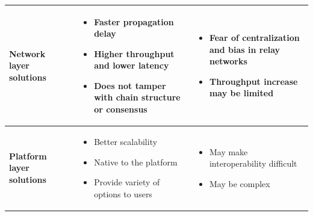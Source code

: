\begin{table}[htbp]
{\begin{tabularx}{\textwidth}{@{}p{2.4cm} p{2.7cm} >{\raggedright\arraybackslash}X >{\raggedright\arraybackslash}X@{}}
\multirow{1}{*}{\textbf{Network layer solutions}}
&  &
\begin{itemize}
  \item Faster propagation delay
  \item Higher throughput and lower latency
  \item Does not tamper with chain structure or consensus
\end{itemize} &
\begin{itemize}
  \item Fear of centralization and bias in relay networks
  \item Throughput increase may be limited
\end{itemize} \\
\midrule

\multirow{1}{*}{\textbf{Platform layer solutions}}
&  &
\begin{itemize}
  \item Better scalability
  \item Native to the platform
  \item Provide variety of options to users
\end{itemize} &
\begin{itemize}
  \item May make interoperability difficult
  \item May be complex
\end{itemize} \\
\bottomrule
\end{tabularx}%
}
\endgroup
\end{table}
